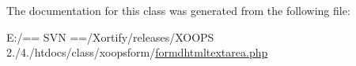 The documentation for this class was generated from the following file\-:\begin{DoxyCompactItemize}
\item 
E\-:/== S\-V\-N ==/\-Xortify/releases/\-X\-O\-O\-P\-S 2./4./htdocs/class/xoopsform/\hyperlink{formdhtmltextarea_8php}{formdhtmltextarea.\-php}\end{DoxyCompactItemize}
